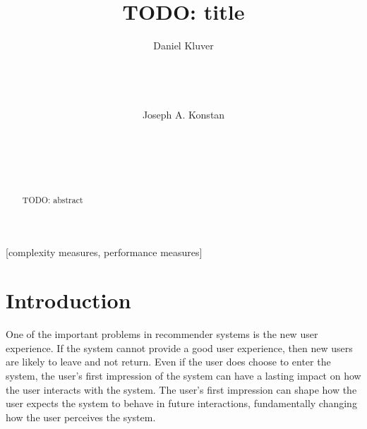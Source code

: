 \documentclass[letterpaper]{sig-alternate}
\begin{document}

\title{TODO: title}


\author {
\alignauthor
Daniel Kluver\\
\\
\\
\\
\\
\alignauthor
Joseph A. Konstan\\
\\
\\
\\
\\
}

\maketitle
\begin{abstract}

TODO: abstract

\end{abstract}

[complexity measures, performance measures]



\section{Introduction}

  One of the important problems in recommender systems is the new user experience.
  If the system cannot provide a good user experience, then new users are likely to leave and not return.
  Even if the user does choose to enter the system, the user's first impression of the system can have a lasting impact on how the user interacts with the system.
  The user's first impression can shape how the user expects the system to behave in future interactions, fundamentally changing how the user perceives the system.
\end{document}
